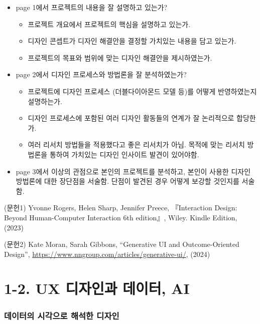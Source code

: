 \documentclass[
  letterpaper,
  DIV=11,
  numbers=noendperiod]{scrreprt}
\providecommand{\tightlist}{%
  \setlength{\itemsep}{0pt}\setlength{\parskip}{0pt}}\usepackage{longtable,booktabs,array}
\begin{document}
\begin{itemize}
\tightlist
\item
  page 1에서 프로젝트의 내용을 잘 설명하고 있는가?

  \begin{itemize}
  \tightlist
  \item
    프로젝트 개요에서 프로젝트의 핵심을 설명하고 있는가.
  \item
    디자인 콘셉트가 디자인 해결안을 결정할 가치있는 내용을 담고 있는가.
  \item
    프로젝트의 목표와 범위에 맞는 디자인 해결안을 제시하였는가.
  \end{itemize}
\item
  page 2에서 디자인 프로세스와 방법론을 잘 분석하였는가?

  \begin{itemize}
  \tightlist
  \item
    프로젝트에 디자인 프로세스 (더블다이아몬드 모델 등)를 어떻게
    반영하였는지 설명하는가.
  \item
    디자인 프로세스에 포함된 여러 디자인 활동들의 연계가 잘 논리적으로
    합당한가.
  \item
    여러 리서치 방법들을 적용했다고 좋은 리서치가 아님. 목적에 맞는
    리서치 방법론을 통하여 가치있는 디자인 인사이트 발견이 있어야함.
  \end{itemize}
\item
  page 3에서 이상의 관점으로 본인의 프로젝트를 분석하고, 본인이 사용한
  디자인 방법론에 대한 장단점을 서술함. 단점이 발견된 경우 어떻게 보강할
  것인지를 서술함.
\end{itemize}

(문헌1) Yvonne Rogers, Helen Sharp, Jennifer Preece, 『Interaction
Design: Beyond Human-Computer Interaction 6th edition』, Wiley. Kindle
Edition, (2023)

(문헌2) Kate Moran, Sarah Gibbons, ``Generative UI and Outcome-Oriented
Design'', \url{https://www.nngroup.com/articles/generative-ui/}, (2024)


\chapter{1-2. UX 디자인과 데이터,
AI}\label{ux-uxb514uxc790uxc778uxacfc-uxb370uxc774uxd130-ai}

\subsection{데이터의 시각으로 해석한
디자인}\label{uxb370uxc774uxd130uxc758-uxc2dcuxac01uxc73cuxb85c-uxd574uxc11duxd55c-uxb514uxc790uxc778}
\end{document}
